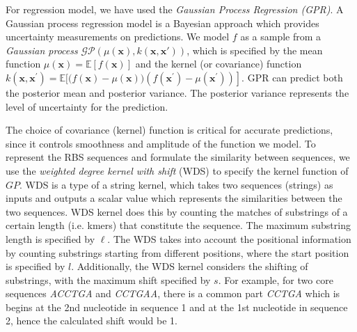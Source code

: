 For regression model, we have used the \textit{Gaussian Process Regression (GPR)}.
A Gaussian process regression model \cite{Rasmussen2004} is a Bayesian approach which provides uncertainty measurements on predictions. 
We model $f$ as a sample from a \textit{Gaussian process} $\mathcal{G} \mathcal{P}(\mu(\mathbf{x}), k(\mathbf{x}, \mathbf{x'}))$, which is specified by the mean function $\mu(\mathbf{x})=\mathbb{E}[f(\mathbf{x})]$ and the kernel (or covariance) function $k\left(\mathbf{x}, \mathbf{x}^{\prime}\right)=\mathbb{E}[(f(\mathbf{x})-\left.\mu(\mathbf{x}))\left(f\left(\mathbf{x}^{\prime}\right)-\mu\left(\mathbf{x}^{\prime}\right)\right)\right]$.
GPR can predict both the posterior mean and posterior variance. The posterior variance represents the level of uncertainty for the prediction. 


The choice of covariance (kernel) function is critical for accurate predictions, since it controls smoothness and amplitude of the function we model.
To represent the RBS sequences and formulate the similarity between sequences, we use the \textit{weighted degree kernel with shift} (WDS) \cite{ratsch_rase_2005} to specify the kernel function of $GP$.  
WDS is a type of a string kernel, which takes two sequences (strings) as inputs and outputs a scalar value which represents the similarities between the two sequences.  
WDS kernel does this by counting the matches of substrings of a certain length (i.e. kmers) that constitute the sequence.
The maximum substring length is specified by $\ell$. 
The WDS takes into account the positional information by counting substrings starting from different positions, where the start position is specified by $l$.
Additionally, the WDS kernel considers the shifting of substrings, with the maximum shift specified by $s$.
For example, for two core sequences \textit{ACCTGA} and \textit{CCTGAA}, there is a common part \textit{CCTGA} which is begins at the 2nd nucleotide in sequence 1 and at the 1st nucleotide in sequence 2, hence the calculated shift would be 1.

